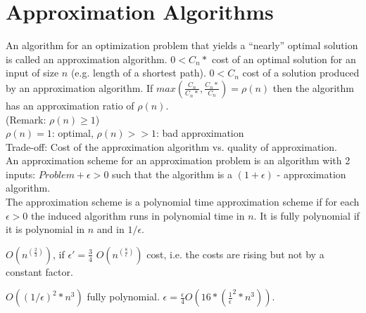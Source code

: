 \chapter{Approximation Algorithms}
An algorithm for an optimization problem that yields a ``nearly''
optimal solution is called an approximation algorithm.
$0<C_{n}*$ cost of an optimal solution for an input of size
$n$ (e.g. length of a shortest path). $0<C_{n}$ cost of a solution
produced by an approximation algorithm. If 
$max(\frac{C_{n}}{C_{n}*},\frac{C_{n}*}{C_{n}})=\rho (n)$ then
the algorithm has an approximation ratio of $\rho (n)$.\\
(Remark: $\rho (n) \ge 1$)\\
$\rho (n) = 1$: optimal, $\rho(n) >> 1$: bad approximation\\
Trade-off: Cost of the approximation algorithm vs. quality of approximation.\\
An approximation scheme for an approximation problem is an 
algorithm with 2 inputs: $Problem + \epsilon>0$ such that
the algorithm is a $(1 + \epsilon)$ - approximation algorithm.\\
The approximation scheme is a polynomial time approximation
scheme if for each $\epsilon > 0$ the induced algorithm runs in polynomial time in $n$.
It is fully polynomial if it is polynomial in $n$ and in $1/\epsilon$.
\begin{example}
$O(n^(\frac{2}{3}))$, if $\epsilon' = \frac{3}{4}$ $O(n^(\frac{8}{\epsilon}))$ cost, i.e.
the costs are rising but not by a constant factor.
\end{example}
\begin{example}
$O((1/\epsilon)^2 * n^3)$ fully polynomial. $\epsilon = \frac{\epsilon}{4}
O(16*(\frac{1}{\epsilon}^2 * n^3))$.
\end{example}
